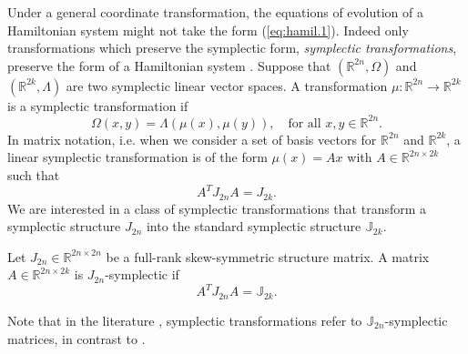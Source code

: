 Under a general coordinate transformation, the equations of evolution of a Hamiltonian system might not take the form (\ref{eq:hamil.1}). Indeed only transformations which preserve the symplectic form, \emph{symplectic transformations}, preserve the form of a Hamiltonian system \cite{Hairer:1250576}. Suppose that $(\mathbb R^{2n},\Omega)$ and $(\mathbb R^{2k},\Lambda)$ are two symplectic linear vector spaces. A transformation $\mu:\mathbb R^{2n}\to\mathbb R^{2k}$ is a symplectic transformation if
\begin{equation} \label{eq:hamil.3}
	\Omega(x,y) = \Lambda(\mu(x),\mu(y)), \quad \text{for all } x,y\in\mathbb R^{2n}.
\end{equation}
In matrix notation, i.e. when we consider a set of basis vectors for $\mathbb R^{2n}$ and $\mathbb R^{2k}$, a linear symplectic transformation is of the form $\mu(x) = Ax$ with $A\in \mathbb R^{2n\times 2k}$ such that
\begin{equation} \label{eq:hamil.4}
	A^T J_{2n} A = J_{2k}.
\end{equation}
We are interested in a class of symplectic transformations that transform a symplectic structure $J_{2n}$ into the standard symplectic structure $\mathbb J_{2k}$.
\begin{definition} \label{def:symp-mat}
Let $J_{2n}\in \mathbb R^{2n\times 2n}$ be a full-rank skew-symmetric structure matrix. A matrix $A\in\mathbb R^{2n\times 2k}$ is $J_{2n}$-symplectic if
\begin{equation} \label{eq:hamil.5}
A^T J_{2n} A = \mathbb{J}_{2k}.
\end{equation}
\end{definition}
Note that in the literature \cite{Marsden:2010:IMS:1965128,Hairer:1250576}, symplectic transformations refer to $\mathbb{J}_{2n}$-symplectic matrices, in contrast to .

